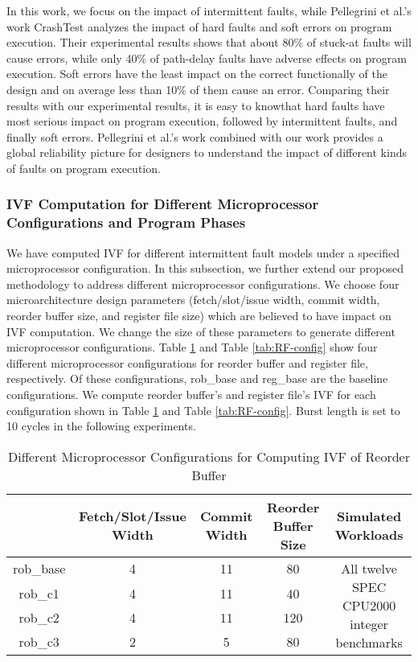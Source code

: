 In this work, we focus on the impact of intermittent faults, while Pellegrini et al.’s work CrashTest \cite{pellegrini2008crashtest} analyzes the impact of hard faults and soft errors on program execution. Their experimental results shows that about 80\% of stuck-at faults will cause errors, while only 40\% of path-delay faults have adverse effects on program execution. Soft errors have the least impact on the correct functionally of the design and on average less than 10\% of them cause an error. Comparing their results with our experimental results, it is easy to knowthat hard faults have most serious impact on program execution, followed by intermittent faults, and finally soft errors. Pellegrini et al.’s work combined with our work provides a global reliability picture for designers to understand the impact of different kinds of faults on program execution.

\subsubsection{IVF Computation for Different Microprocessor Configurations and Program Phases}
We have computed IVF for different intermittent fault models under a specified microprocessor configuration. In this subsection, we further extend our proposed methodology to address different microprocessor configurations. We choose four microarchitecture design parameters (fetch/slot/issue width, commit width, reorder buffer size, and register file size) which are believed to have impact on IVF computation. We change the size of these parameters to generate different microprocessor configurations. Table \ref{tab:ROB-config} and Table \ref{tab:RF-config} show four different microprocessor configurations for reorder buffer and register file, respectively. Of these configurations, rob\_base and reg\_base are the baseline configurations. We compute reorder buffer’s and register file’s IVF for each configuration shown in Table \ref{tab:ROB-config} and Table \ref{tab:RF-config}. Burst length is set to 10 cycles in the following experiments.

\begin{table}
    \caption{Different Microprocessor Configurations for Computing IVF of Reorder Buffer}
    \begin{tabular}{c|cccc}
        \hline
        & Fetch/Slot/Issue Width & Commit Width & Reorder Buffer Size & Simulated Workloads   \\ \hline
        rob\_base & 4 & 11 & 80 & \multirow{4}{*}{All twelve SPEC CPU2000 integer benchmarks} \\
        rob\_c1 & 4 & 11 & 40 & \\
        rob\_c2 & 4 & 11 & 120 & \\
        rob\_c3 & 2 & 5 & 80 & \\ \hline
    \end{tabular}
    \label{tab:ROB-config}
\end{table}

